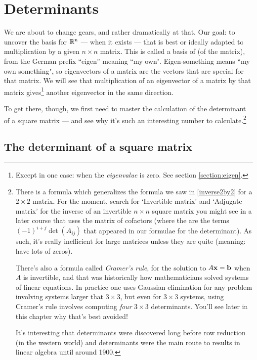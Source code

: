 \chapter{Determinants}
\label{chapter:21Det}
We are about to change gears, and rather dramatically at that.  
Our goal: to uncover the basis for $\mathbb{R}^n$ --- when it exists --- 
that is best or ideally adapted to multiplication by a given $n\times n$ matrix.
This is called a basis of  (of the matrix),
from the German prefix ``eigen'' meaning ``my own". Eigen-something   means ``my own something", so  eigenvectors of a matrix are the vectors that are special for that matrix. We will see that multiplication of an eigenvector of a matrix  by that matrix gives\footnote{Except in one case: when the {\it eigenvalue} is zero. See section \ref{section:eigen}.} another eigenvector in the same direction.

To get there, though, we first need to master the calculation of
the determinant of a square matrix --- and see why it's such an
interesting number to calculate.\footnote{There is a formula which generalizes the formula we saw in \ref{inverse2by2}  for a $2\times2$ matrix. For the moment, search for `Invertible matrix' and `Adjugate matrix'  for the inverse of an invertible $n \times n$ square matrix you might see in a later course that uses the matrix of cofactors (where
the  are the terms $(-1)^{i+j} \det(A_{ij})$ that
appeared in our formulae for the determinant).  As such, it's 
really inefficient for large matrices unless they are quite 
(meaning: have lots of zeros). 

There's also a formula called {\it Cramer's rule},  for the solution to $A\mathbf{x}=\mathbf{b}$ when $A$ is invertible, and that was historically how mathematicians solved systems of
linear equations. In practice one uses Gaussian elimination for any problem involving systems larger that $3 \times 3$, but even for $3 \times 3$ systems,  using  Cramer's rule involves computing {\it four} $3 \times 3$ determinants. You'll see later in this chapter why that's best avoided! 

It's interesting that determinants were discovered long 
before row reduction (in the western world) and determinants were the main route
to results in linear algebra until around 1900. }


\section{The determinant of a square matrix}

